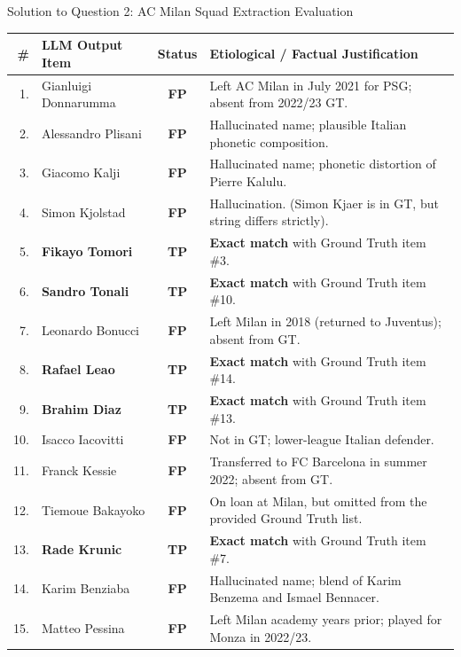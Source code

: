 \documentclass[11pt,a4paper]{article}
\begin{document}
\begin{solutionbox}{Solution to Question 2: AC Milan Squad Extraction Evaluation}
\begin{center}
\small
\begin{tabularx}{\linewidth}{r l c X}
\toprule
\textbf{\#} & \textbf{LLM Output Item} & \textbf{Status} & \textbf{Etiological / Factual Justification} \\
\midrule
1. & Gianluigi Donnarumma & \textbf{FP} & Left AC Milan in July 2021 for PSG; absent from 2022/23 GT. \\
2. & Alessandro Plisani & \textbf{FP} & Hallucinated name; plausible Italian phonetic composition. \\
3. & Giacomo Kalji & \textbf{FP} & Hallucinated name; phonetic distortion of Pierre Kalulu. \\
4. & Simon Kjolstad & \textbf{FP} & Hallucination. (Simon Kjaer is in GT, but string differs strictly). \\
5. & \textbf{Fikayo Tomori} & \textbf{TP} & \textbf{Exact match} with Ground Truth item \#3. \\
6. & \textbf{Sandro Tonali} & \textbf{TP} & \textbf{Exact match} with Ground Truth item \#10. \\
7. & Leonardo Bonucci & \textbf{FP} & Left Milan in 2018 (returned to Juventus); absent from GT. \\
8. & \textbf{Rafael Leao} & \textbf{TP} & \textbf{Exact match} with Ground Truth item \#14. \\
9. & \textbf{Brahim Diaz} & \textbf{TP} & \textbf{Exact match} with Ground Truth item \#13. \\
10. & Isacco Iacovitti & \textbf{FP} & Not in GT; lower-league Italian defender. \\
11. & Franck Kessie & \textbf{FP} & Transferred to FC Barcelona in summer 2022; absent from GT. \\
12. & Tiemoue Bakayoko & \textbf{FP} & On loan at Milan, but omitted from the provided Ground Truth list. \\
13. & \textbf{Rade Krunic} & \textbf{TP} & \textbf{Exact match} with Ground Truth item \#7. \\
14. & Karim Benziaba & \textbf{FP} & Hallucinated name; blend of Karim Benzema and Ismael Bennacer. \\
15. & Matteo Pessina & \textbf{FP} & Left Milan academy years prior; played for Monza in 2022/23. \\
\bottomrule
\end{tabularx}
\end{center}


\end{solutionbox}
\end{document}
